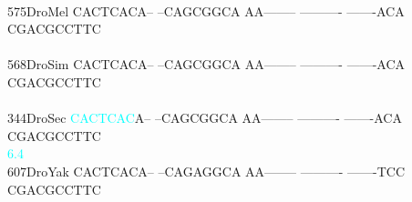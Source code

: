 \documentclass[11pt,twoside,reqno,a4paper]{article}
\begin{document}
{\\
575\hspace*{2\charwidth}DroMel	CACTCACA--	--CAGCGGCA	AA--------	----------	-------ACA	CGACGCCTTC	\\
\hspace*{5\charwidth}\hspace*{7\charwidth}\hspace*{1\charwidth}\hspace*{1\charwidth}\hspace*{1\charwidth}\hspace*{1\charwidth}\hspace*{1\charwidth}\hspace*{1\charwidth}\\
568\hspace*{2\charwidth}DroSim	CACTCACA--	--CAGCGGCA	AA--------	----------	-------ACA	CGACGCCTTC	\\
\hspace*{5\charwidth}\hspace*{7\charwidth}\hspace*{1\charwidth}\hspace*{1\charwidth}\hspace*{1\charwidth}\hspace*{1\charwidth}\hspace*{1\charwidth}\hspace*{1\charwidth}\\
344\hspace*{2\charwidth}DroSec	\textcolor{cyan}{C}\textcolor{cyan}{A}\textcolor{cyan}{C}\textcolor{cyan}{T}\textcolor{cyan}{C}\textcolor{cyan}{A}\textcolor{cyan}{C}A--	--CAGCGGCA	AA--------	----------	-------ACA	CGACGCCTTC	\\
\hspace*{5\charwidth}\hspace*{7\charwidth}\hspace*{0\charwidth}\textcolor{cyan}{6.4}\hspace*{1\charwidth}\hspace*{1\charwidth}\hspace*{1\charwidth}\hspace*{1\charwidth}\hspace*{1\charwidth}\hspace*{1\charwidth}\\
607\hspace*{2\charwidth}DroYak	CACTCACA--	--CAGAGGCA	AA--------	----------	-------TCC	CGACGCCTTC	\\
\hspace*{5\charwidth}\hspace*{7\charwidth}\hspace*{1\charwidth}\hspace*{1\charwidth}\hspace*{1\charwidth}\hspace*{1\charwidth}\hspace*{1\charwidth}\hspace*{1\charwidth}\\
}
\end{document}
